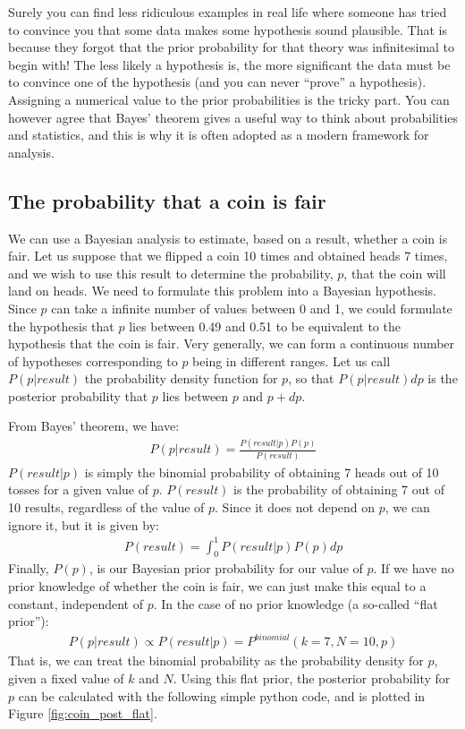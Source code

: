 Surely you can find less ridiculous examples in real life where someone has tried to convince you that some data makes some hypothesis sound plausible. That is because they forgot that the prior probability for that theory was infinitesimal to begin with! The less likely a hypothesis is, the more significant the data must be to convince one of the hypothesis (and you can never ``prove'' a hypothesis). Assigning a numerical value to the prior probabilities is the tricky part. You can however agree that Bayes' theorem  gives a useful way to think about probabilities and statistics, and this is why it is often adopted as a modern framework for analysis.

\subsection{The probability that a coin is fair}
\label{sec:BayesianCoin}
We can use a Bayesian analysis to estimate, based on a result, whether a coin is fair. Let us suppose that we flipped a coin 10 times and obtained heads 7 times, and we wish to use this result to determine the probability, $p$, that the coin will land on heads. We need to formulate this problem into a Bayesian hypothesis. Since $p$ can take a infinite number of values between 0 and 1, we could formulate the hypothesis that $p$ lies between 0.49 and 0.51 to be equivalent to the hypothesis that the coin is fair. Very generally, we can form a continuous number of hypotheses corresponding to $p$ being in different ranges. Let us call $P(p|result)$ the probability density function for $p$, so that $P(p|result)dp$ is the posterior probability that $p$ lies between $p$ and $p+dp$.

From Bayes' theorem, we have:
\begin{align*}
P(p|result)=\frac{P(result|p)P(p)}{P(result)}
\end{align*}
$P(result|p)$ is simply the binomial probability of obtaining 7 heads out of 10 tosses for a given value of $p$. $P(result)$ is the probability of obtaining 7 out of 10 results, regardless of the value of $p$. Since it does not depend on $p$, we can ignore it, but it is given by:
\begin{align*}
P(result) = \int_0^1P(result|p)P(p)dp
\end{align*}
Finally, $P(p)$, is our Bayesian prior probability for our value of $p$. If we have no prior knowledge of whether the coin is fair, we can just make this equal to a constant, independent of $p$. In the case of no prior knowledge (a so-called ``flat prior''):
\begin{align*}
P(p|result)\propto P(result|p)=P^{binomial}(k=7,N=10,p)
\end{align*}
That is, we can treat the binomial probability as the probability density for $p$, given a fixed value of $k$ and $N$. Using this flat prior, the posterior probability for $p$ can be calculated with the following simple python code, and is plotted in Figure \ref{fig:coin_post_flat}.

